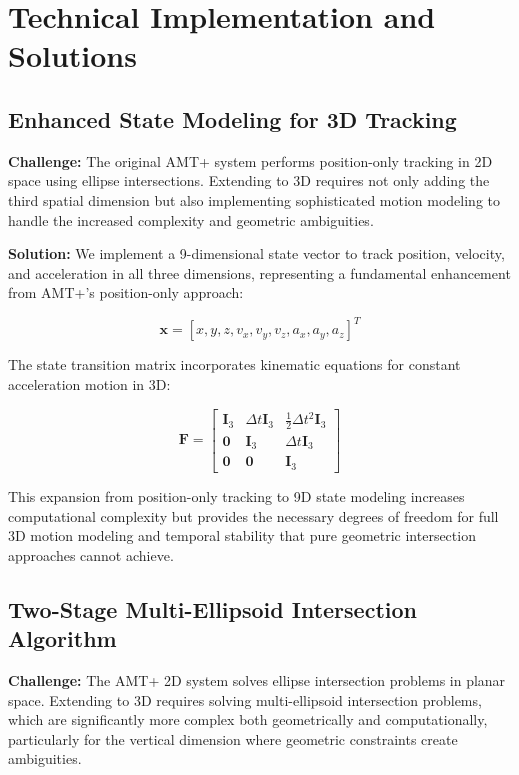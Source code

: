 \documentclass[a4paper]{article}
\begin{document}
\section{Technical Implementation and Solutions}

\subsection{Enhanced State Modeling for 3D Tracking}

{\bf Challenge:} The original AMT+ system performs position-only tracking in 2D space using ellipse intersections. Extending to 3D requires not only adding the third spatial dimension but also implementing sophisticated motion modeling to handle the increased complexity and geometric ambiguities.

{\bf Solution:} We implement a 9-dimensional state vector to track position, velocity, and acceleration in all three dimensions, representing a fundamental enhancement from AMT+'s position-only approach:

\begin{equation}
\mathbf{x} = [x, y, z, v_x, v_y, v_z, a_x, a_y, a_z]^T
\label{eq:state_vector}
\end{equation}

The state transition matrix incorporates kinematic equations for constant acceleration motion in 3D:

\begin{equation}
\mathbf{F} = \begin{bmatrix}
\mathbf{I}_3 & \Delta t \mathbf{I}_3 & \frac{1}{2}\Delta t^2 \mathbf{I}_3 \\
\mathbf{0} & \mathbf{I}_3 & \Delta t \mathbf{I}_3 \\
\mathbf{0} & \mathbf{0} & \mathbf{I}_3
\end{bmatrix}
\label{eq:transition_matrix}
\end{equation}

This expansion from position-only tracking to 9D state modeling increases computational complexity but provides the necessary degrees of freedom for full 3D motion modeling and temporal stability that pure geometric intersection approaches cannot achieve.

\subsection{Two-Stage Multi-Ellipsoid Intersection Algorithm}

{\bf Challenge:} The AMT+ 2D system solves ellipse intersection problems in planar space. Extending to 3D requires solving multi-ellipsoid intersection problems, which are significantly more complex both geometrically and computationally, particularly for the vertical dimension where geometric constraints create ambiguities.
\end{document}
